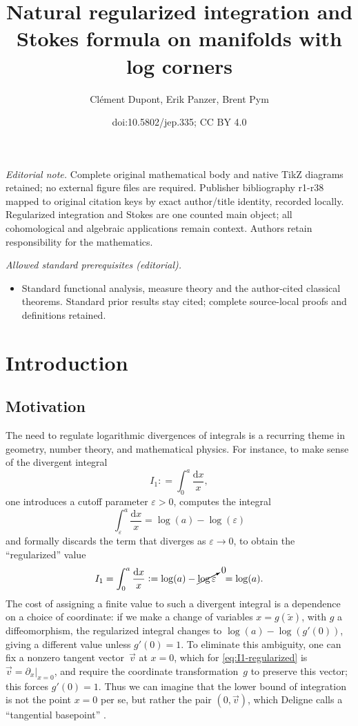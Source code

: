 \documentclass[10pt]{amsart}
\title{Natural regularized integration and Stokes formula on manifolds with log corners}
\author{Clément Dupont, Erik Panzer, Brent Pym}
\date{doi:10.5802/jep.335; CC BY 4.0}
\theoremstyle{definition}
\theoremstyle{remark}
\newcommand{\defas}{\mathrel{\mathop:}=}
\let\epsilon\varepsilon
\newcommand{\dd}{\mathrm{d}}
\newcommand{\dlog}[1]{\frac{\dd#1}{#1}}
\providecommand{\mainmatter}{}
\begin{document}
\maketitle
\noindent\textit{Editorial note.} Complete original mathematical body and native TikZ diagrams retained; no external figure files are required. Publisher bibliography r1-r38 mapped to original citation keys by exact author/title identity, recorded locally. Regularized integration and Stokes are one counted main object; all cohomological and algebraic applications remain context. Authors retain responsibility for the mathematics.\par\medskip
\noindent\textit{Allowed standard prerequisites (editorial).}\begin{itemize}
\item Standard functional analysis, measure theory and the author-cited classical theorems. Standard prior results stay cited; complete source-local proofs and definitions retained.
\end{itemize}\medskip
\vspace*{-\baselineskip}
\tableofcontents
\mainmatter

\section{Introduction}

\subsection{Motivation}\label{sec:motivation}
The need to regulate logarithmic divergences of integrals is a recurring theme in geometry, number theory, and mathematical physics. For instance, to make sense of the divergent integral
\[
I_1 \defas
\int_0^a \dlog{x},
\]
one introduces a cutoff parameter $\epsilon > 0$, computes the integral
\[
\int_{\epsilon}^a \dlog{x} = \log(a) -\log(\epsilon)
\]
and formally discards the term that diverges as $\epsilon \to 0$, to obtain the ``regularized'' value
\begin{align}
I_1 = \int_0^a \dlog{x} \defas \log(a) - \cancelto{0}{\log\epsilon} \ \ = \log(a). \label{eq:I1-regularized}
\end{align}
The cost of assigning a finite value to such a divergent integral is a dependence on a choice of coordinate: if we make a change of variables $x = g(\tilde x)$, with $g$ a diffeomorphism, the regularized integral changes to $\log(a) - \log(g'(0))$, giving a different value unless $g'(0)=1$. To eliminate this ambiguity, one can fix a nonzero tangent vector~$\vec{v}$ at $x=0$, which for \eqref{eq:I1-regularized} is $\vec{v}=\partial_x|_{x=0}$, and require the coordinate transformation~$g$ to preserve this vector; this forces $g'(0)=1$. Thus we can imagine that the lower bound of integration is not the point $x=0$ per se, but rather the pair $(0,\vec{v})$, which Deligne calls a ``tangential basepoint'' \cite{Deligne1989}.
\end{document}
